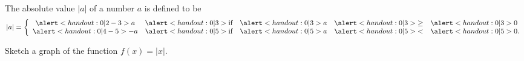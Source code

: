 \begin{frame}
\begin{example}[Example 8, p. 18]
The absolute value $|a|$ of a number $a$ is defined to be
\[
|a| = \left\{ \begin{array}{ccccl}
\alert<handout:0| 2-3>{a} & \alert<handout:0| 3>{\textrm{if}} & \alert<handout:0| 3>{ a} & \alert<handout:0| 3>{\geq} & \alert<handout:0| 3>{0} \\
\alert<handout:0| 4-5>{-a} & \alert<handout:0| 5>{\textrm{if}} &  \alert<handout:0| 5>{a} & \alert<handout:0| 5>{<} & \alert<handout:0| 5>{0}. \end{array}\right.
\]

Sketch a graph of the function $f(x) = |x|$.

\begin{center}
\ %
%
%
\end{center}
\end{example}
\end{frame}
